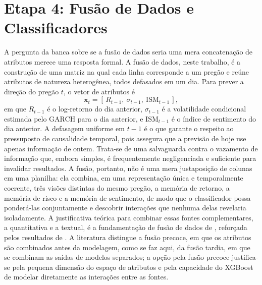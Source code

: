 \section{Etapa 4: Fusão de Dados e Classificadores}
\label{sec:metodologia_modelagem}

A pergunta da banca sobre se a fusão de dados seria uma mera concatenação de atributos merece uma resposta formal. A fusão de dados, neste trabalho, é a construção de uma matriz na qual cada linha corresponde a um pregão e reúne atributos de natureza heterogênea, todos defasados em um dia. Para prever a direção do pregão $t$, o vetor de atributos é
\begin{equation}
\mathbf{x}_t = \left[\, R_{t-1},\ \sigma_{t-1},\ \text{ISM}_{t-1} \,\right],
\end{equation}
em que $R_{t-1}$ é o log-retorno do dia anterior, $\sigma_{t-1}$ é a volatilidade condicional estimada pelo GARCH para o dia anterior, e $\text{ISM}_{t-1}$ é o índice de sentimento do dia anterior. A defasagem uniforme em $t-1$ é o que garante o respeito ao pressuposto de causalidade temporal, pois assegura que a previsão de hoje use apenas informação de ontem. Trata-se de uma salvaguarda contra o vazamento de informação que, embora simples, é frequentemente negligenciada e suficiente para invalidar resultados. A fusão, portanto, não é uma mera justaposição de colunas em uma planilha: ela combina, em uma representação única e temporalmente coerente, três visões distintas do mesmo pregão, a memória de retorno, a memória de risco e a memória de sentimento, de modo que o classificador possa ponderá-las conjuntamente e descobrir interações que nenhuma delas revelaria isoladamente. A justificativa teórica para combinar essas fontes complementares, a quantitativa e a textual, é a fundamentação de fusão de dados de , reforçada pelos resultados de . A literatura distingue a fusão precoce, em que os atributos são combinados antes da modelagem, como se faz aqui, da fusão tardia, em que se combinam as saídas de modelos separados; a opção pela fusão precoce justifica-se pela pequena dimensão do espaço de atributos e pela capacidade do XGBoost de modelar diretamente as interações entre as fontes.

